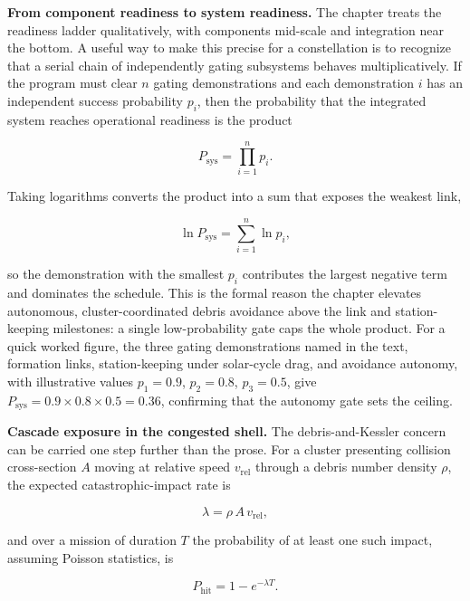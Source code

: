 \documentclass[
  11pt,
  openany,
  oneside]{book}
\begin{document}
\textbf{From component readiness to system readiness.} The chapter
treats the readiness ladder qualitatively, with components mid-scale and
integration near the bottom. A useful way to make this precise for a
constellation is to recognize that a serial chain of independently
gating subsystems behaves multiplicatively. If the program must clear
\(n\) gating demonstrations and each demonstration \(i\) has an
independent success probability \(p_i\), then the probability that the
integrated system reaches operational readiness is the product

\begin{equation}
P_{\text{sys}} = \prod_{i=1}^{n} p_i. \tag{23.1}
\end{equation}

Taking logarithms converts the product into a sum that exposes the
weakest link,

\begin{equation}
\ln P_{\text{sys}} = \sum_{i=1}^{n} \ln p_i, \tag{23.2}
\end{equation}

so the demonstration with the smallest \(p_i\) contributes the largest
negative term and dominates the schedule. This is the formal reason the
chapter elevates autonomous, cluster-coordinated debris avoidance above
the link and station-keeping milestones: a single low-probability gate
caps the whole product. For a quick worked figure, the three gating
demonstrations named in the text, formation links, station-keeping under
solar-cycle drag, and avoidance autonomy, with illustrative values
\(p_1 = 0.9\), \(p_2 = 0.8\), \(p_3 = 0.5\), give
\(P_{\text{sys}} = 0.9 \times 0.8 \times 0.5 = 0.36\), confirming that
the autonomy gate sets the ceiling.

\textbf{Cascade exposure in the congested shell.} The debris-and-Kessler
concern can be carried one step further than the prose. For a cluster
presenting collision cross-section \(A\) moving at relative speed
\(v_{\text{rel}}\) through a debris number density \(\rho\), the
expected catastrophic-impact rate is

\begin{equation}
\lambda = \rho\, A\, v_{\text{rel}}, \tag{23.3}
\end{equation}

and over a mission of duration \(T\) the probability of at least one
such impact, assuming Poisson statistics, is

\begin{equation}
P_{\text{hit}} = 1 - e^{-\lambda T}. \tag{23.4}
\end{equation}
\end{document}
